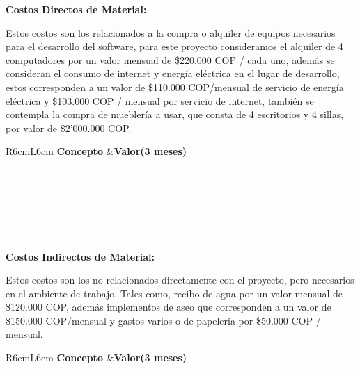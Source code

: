\documentclass[a4paper,12 pt]{article}
\begin{document}
\textbf{Costos Directos de Material:}

Estos costos son los relacionados a la compra o alquiler de equipos necesarios 
para el desarrollo del software, para este proyecto consideramos el alquiler de 
4 computadores \cite{02} por un valor mensual de \$220.000 COP / cada uno,
además se consideran 
el consumo de internet y energía eléctrica en el lugar de desarrollo, estos
corresponden a un valor de \$110.000 COP/mensual de servicio 
de energía eléctrica y \$103.000 COP / mensual por servicio de internet, también
se contempla la compra de mueblería a usar, que consta de 4 escritorios y 4
sillas, por valor de \$2'000.000 COP.

\begin{table}[H]
    \centering
    \small{
    \begin{tabular}{R{6cm}L{6cm}}
        \textbf{Concepto}   &\textbf{Valor(3 meses)}\\
        \\
         \\
         \\
         \\
         \\
        \hline
         \\
    \end{tabular}
    \label{T03}}
\end{table}{}

\textbf{Costos Indirectos de Material:}

Estos costos son los no relacionados directamente con el proyecto, pero
necesarios en el ambiente de trabajo. Tales como, recibo de agua por un valor
mensual de \$120.000 COP, además implementos de aseo que corresponden a un valor
de \$150.000 COP/mensual y gastos varios o de papelería por \$50.000 COP /
mensual.

\begin{table}[H]
    \centering
    \small{
    \begin{tabular}{R{6cm}L{6cm}}
        \textbf{Concepto}   &\textbf{Valor(3 meses)}\\
        \\
         \\
         \\
         \\
        \hline
         \\
    \end{tabular}
    \label{T203}}
\end{table}{}
\end{document}
